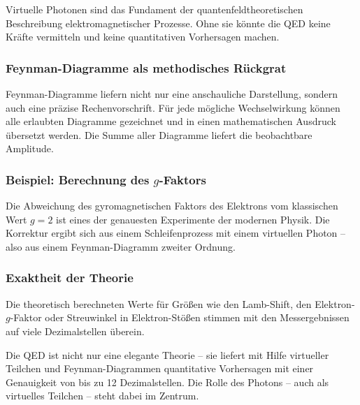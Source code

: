 \vspace{1em}
\begin{tcolorbox}[physikbox, title=Ohne virtuelle Photonen keine QED]
	\label{box:Ohne virtuelle Photonen keine}
	Virtuelle Photonen sind das Fundament der quantenfeldtheoretischen Beschreibung elektromagnetischer Prozesse. Ohne sie könnte die QED keine Kräfte vermitteln und keine quantitativen Vorhersagen machen.
\end{tcolorbox}

\subsubsection*{Feynman-Diagramme als methodisches Rückgrat}
Feynman-Diagramme liefern nicht nur eine anschauliche Darstellung, sondern auch eine präzise Rechenvorschrift. Für jede mögliche Wechselwirkung können alle erlaubten Diagramme gezeichnet und in einen mathematischen Ausdruck übersetzt werden. Die Summe aller Diagramme liefert die beobachtbare Amplitude.

\subsubsection*{Beispiel: Berechnung des $g$-Faktors}
Die Abweichung des gyromagnetischen Faktors des Elektrons vom klassischen Wert $g = 2$ ist eines der genauesten Experimente der modernen Physik. Die Korrektur ergibt sich aus einem Schleifenprozess mit einem virtuellen Photon – also aus einem Feynman-Diagramm zweiter Ordnung.

\subsubsection*{Exaktheit der Theorie}
Die theoretisch berechneten Werte für Größen wie den Lamb-Shift, den Elektron-$g$-Faktor oder Streuwinkel in Elektron-Stößen stimmen mit den Messergebnissen auf viele Dezimalstellen überein.
\vspace{1em}
\begin{tcolorbox}[didaktikbox, title=Die Quantenelektrodynamik als Erfolgsmodell]
	\label{box:Die Quantenelekrodynamik}
	Die QED ist nicht nur eine elegante Theorie – sie liefert mit Hilfe virtueller Teilchen und Feynman-Diagrammen quantitative Vorhersagen mit einer Genauigkeit von bis zu 12 Dezimalstellen. Die Rolle des Photons – auch als virtuelles Teilchen – steht dabei im Zentrum.
\end{tcolorbox}


